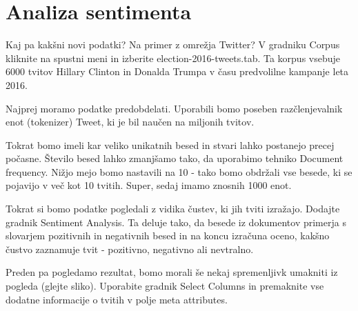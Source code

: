 \chapter{Analiza sentimenta}
\label{ch:analiza-sentimenta}

Kaj pa kakšni novi podatki? Na primer z omrežja Twitter? V gradniku Corpus kliknite na spustni meni in izberite election-2016-tweets.tab. Ta korpus vsebuje 6000 tvitov Hillary Clinton in Donalda Trumpa v času predvolilne kampanje leta 2016.

Najprej moramo podatke predobdelati. Uporabili bomo poseben razčlenjevalnik enot (tokenizer) Tweet, ki je bil naučen na miljonih tvitov.

Tokrat bomo imeli kar veliko unikatnih besed in stvari lahko postanejo precej počasne. Število besed lahko zmanjšamo tako, da uporabimo tehniko Document frequency. Nižjo mejo bomo nastavili na 10 - tako bomo obdržali vse besede, ki se pojavijo v več kot 10 tvitih. Super, sedaj imamo znosnih 1000 enot.

Tokrat si bomo podatke pogledali z vidika čustev, ki jih tviti izražajo. Dodajte gradnik Sentiment Analysis. Ta deluje tako, da besede iz dokumentov primerja s slovarjem pozitivnih in negativnih besed in na koncu izračuna oceno, kakšno čustvo zaznamuje tvit - pozitivno, negativno ali nevtralno.

Preden pa pogledamo rezultat, bomo morali še nekaj spremenljivk umakniti iz pogleda (glejte sliko). Uporabite gradnik Select Columns in premaknite vse dodatne informacije o tvitih v polje meta attributes.

